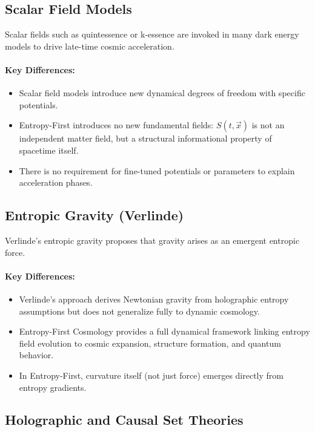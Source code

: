 \documentclass{article}
\begin{document}
\subsection{Scalar Field Models}

Scalar fields such as quintessence or k-essence are invoked in many dark energy models to drive late-time cosmic acceleration.

\paragraph{Key Differences:}
\begin{itemize}
    \item Scalar field models introduce new dynamical degrees of freedom with specific potentials.
    \item Entropy-First introduces no new fundamental fields: $S(t, \vec{x})$ is not an independent matter field, but a structural informational property of spacetime itself.
    \item There is no requirement for fine-tuned potentials or parameters to explain acceleration phases.
\end{itemize}

\subsection{Entropic Gravity (Verlinde)}

Verlinde's entropic gravity proposes that gravity arises as an emergent entropic force.

\paragraph{Key Differences:}
\begin{itemize}
    \item Verlinde's approach derives Newtonian gravity from holographic entropy assumptions but does not generalize fully to dynamic cosmology.
    \item Entropy-First Cosmology provides a full dynamical framework linking entropy field evolution to cosmic expansion, structure formation, and quantum behavior.
    \item In Entropy-First, curvature itself (not just force) emerges directly from entropy gradients.
\end{itemize}

\subsection{Holographic and Causal Set Theories}
\end{document}
